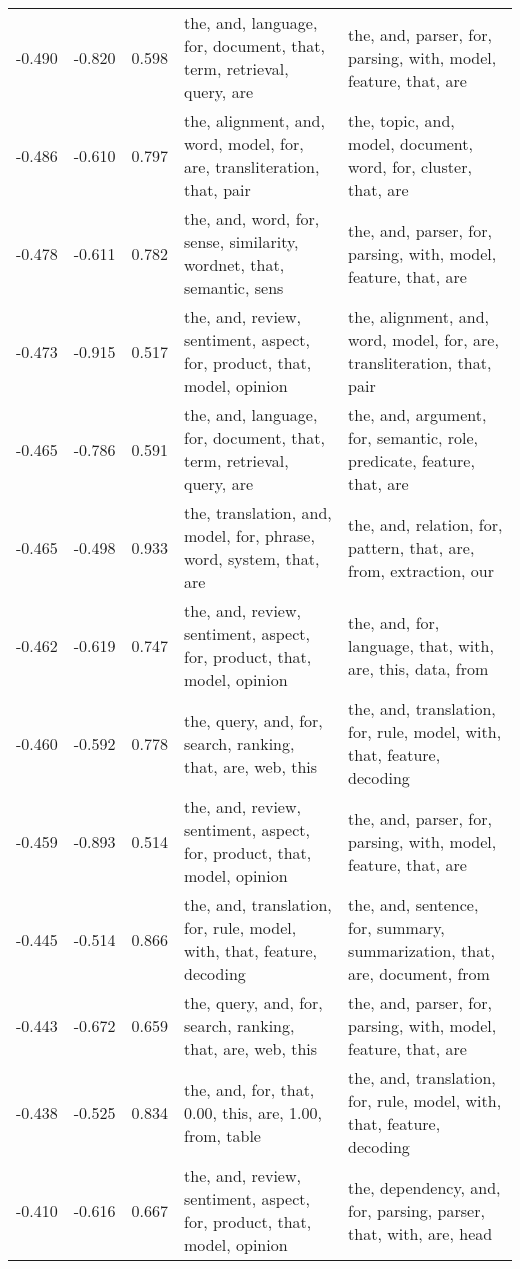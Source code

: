 \begin{tabular}{cccp{5cm}p{5cm}}
-0.490 & -0.820 & 0.598 & the, and, language, for, document, that, term, retrieval, query, are & the, and, parser, for, parsing, with, model, feature, that, are \\
-0.486 & -0.610 & 0.797 & the, alignment, and, word, model, for, are, transliteration, that, pair & the, topic, and, model, document, word, for, cluster, that, are \\
-0.478 & -0.611 & 0.782 & the, and, word, for, sense, similarity, wordnet, that, semantic, sens & the, and, parser, for, parsing, with, model, feature, that, are \\
-0.473 & -0.915 & 0.517 & the, and, review, sentiment, aspect, for, product, that, model, opinion & the, alignment, and, word, model, for, are, transliteration, that, pair \\
-0.465 & -0.786 & 0.591 & the, and, language, for, document, that, term, retrieval, query, are & the, and, argument, for, semantic, role, predicate, feature, that, are \\
-0.465 & -0.498 & 0.933 & the, translation, and, model, for, phrase, word, system, that, are & the, and, relation, for, pattern, that, are, from, extraction, our \\
-0.462 & -0.619 & 0.747 & the, and, review, sentiment, aspect, for, product, that, model, opinion & the, and, for, language, that, with, are, this, data, from \\
-0.460 & -0.592 & 0.778 & the, query, and, for, search, ranking, that, are, web, this & the, and, translation, for, rule, model, with, that, feature, decoding \\
-0.459 & -0.893 & 0.514 & the, and, review, sentiment, aspect, for, product, that, model, opinion & the, and, parser, for, parsing, with, model, feature, that, are \\
-0.445 & -0.514 & 0.866 & the, and, translation, for, rule, model, with, that, feature, decoding & the, and, sentence, for, summary, summarization, that, are, document, from \\
-0.443 & -0.672 & 0.659 & the, query, and, for, search, ranking, that, are, web, this & the, and, parser, for, parsing, with, model, feature, that, are \\
-0.438 & -0.525 & 0.834 & the, and, for, that, 0.00, this, are, 1.00, from, table & the, and, translation, for, rule, model, with, that, feature, decoding \\
-0.410 & -0.616 & 0.667 & the, and, review, sentiment, aspect, for, product, that, model, opinion & the, dependency, and, for, parsing, parser, that, with, are, head \\

\end{tabular}
